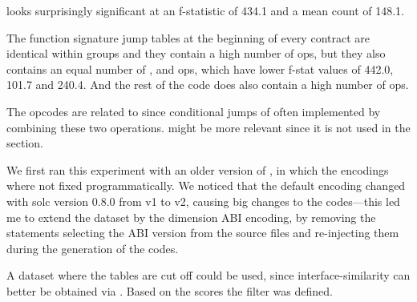 \documentclass[../main.tex]{subfiles}
\begin{document}
 looks surprisingly significant at an f-statistic of 434.1 and a mean count of 148.1.

The  function signature jump tables at the beginning of every contract are identical within groups and they contain a high number of  ops, but they also contains an equal number of ,  and  ops, which have lower f-stat values of 442.0, 101.7 and 240.4. And the rest of the code does also contain a high number of  ops.

The  opcodes are related to  since conditional jumps of often implemented by combining these two operations.  might be more relevant since it is not used in the  section.

We first ran this experiment with an older version of \n{\solcts}, in which the  encodings where not fixed programmatically. We noticed that the default encoding changed with solc version 0.8.0 from v1 to v2, causing big changes to the codes---this led me to extend the dataset by the dimension ABI encoding, by removing the  statements selecting the ABI version from the source files and re-injecting them during the generation of the codes.

A dataset where the  tables are cut off could be used, since interface-similarity can better be obtained via  .
Based on the scores the   filter was defined.
\end{document}
